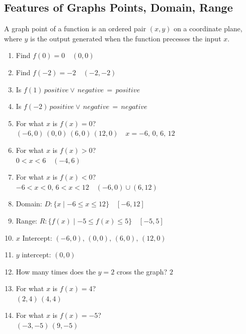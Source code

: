 \subsection{Features of Graphs Points, Domain, Range}
\begin{definition}
  A graph point of a function is an ordered pair $(x, y)$ on a coordinate plane, where $y$ is the output generated when the function precesses the input $x$.
\end{definition}
\begin{example}[Graphs]
  \hfill
  \begin{center}
  \end{center}
  \begin{enumerate}
  \item Find $f(0) = 0 \quad (0, 0)$
  \item Find $f(-2) = -2 \quad (-2, -2)$
  \item Is $f(1) \, positive \lor \, negative \, = \, positive$
  \item Is $f(-2) \, positive \lor \, negative \, = \, negative$
  \item For what $x$ is $f(x) = 0$? \\
    $(-6, 0)\, (0, 0)\, (6, 0)\, (12, 0) \quad x = -6,\, 0,\, 6,\, 12$
  \item For what $x$ is $f(x) > 0$? \\
    $0 < x < 6 \quad (-4, 6)$
  \item For what $x$ is $f(x) < 0$? \\
    $-6 < x < 0,\, 6 < x < 12 \quad (-6, 0) \cup (6, 12)$
  \item Domain: $D : \{x \mid -6 \le x \le 12\} \quad [-6, 12]$
  \item Range: $R : \{f(x)  \mid -5 \le f(x) \le 5\} \quad [-5, 5]$
  \item $x$ Intercept: $(-6, 0), \, (0, 0), \, (6, 0), \, (12, 0)$
  \item $y$ intercept: $(0, 0)$
  \item How many times does the $y = 2$ cross the graph? $2$
  \item For what $x$ is $f(x) = 4$? \\
    $(2, 4)\, (4, 4)$
  \item For what $x$ is $f(x) = -5$? \\
    $(-3, -5)\, (9, -5)$
  \end{enumerate}
\end{example}


